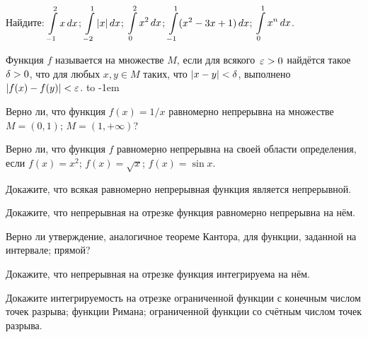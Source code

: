 \documentclass[a4paper,12pt]{article}
\begin{document}
Найдите: 
$\displaystyle\int\limits_{{-1}}^{{2}} x\,dx$;
$\displaystyle\int\limits_{{-2}}^{{1}} |x|\,dx$;
$\displaystyle\int\limits_{{0}}^{{2}} x^2\,dx$;
$\displaystyle\int\limits_{{-1}}^{{1}} (x^2-3x+1)\,dx$;
$\displaystyle\int\limits_{{0}}^{{1}} x^n\,dx$.

Функция $f$ называется  на множестве $M$, если для всякого~$\varepsilon > 0$ найдётся такое $\delta > 0$, что для любых $x,y\in M$ таких, что $|x-y|<\delta$, выполнено $|f(x)-f(y)|<\varepsilon$.
\hbox to -1em{}

Верно ли, что функция $f(x)=1/x$ равномерно непрерывна на множестве\\
$M=(0,1)$;
$M=(1,+\infty)$?

Верно ли, что функция $f$ равномерно непрерывна на своей области определения, если
$f(x)=x^2$;
$f(x)=\sqrt{x}$;
$f(x)=\sin x$.

Докажите, что всякая равномерно непрерывная функция является непрерывной.

Докажите, что непрерывная на отрезке функция равномерно непрерывна на нём.

Верно ли утверждение, аналогичное теореме Кантора, для функции, заданной на 
 интервале;
 прямой?

Докажите, что непрерывная на отрезке функция интегрируема на нём.

Докажите интегрируемость на отрезке
 ограниченной функции с конечным числом точек разрыва;
 функции Римана;
 ограниченной функции со счётным числом точек разрыва.

\vfill
{}
\end{document}
